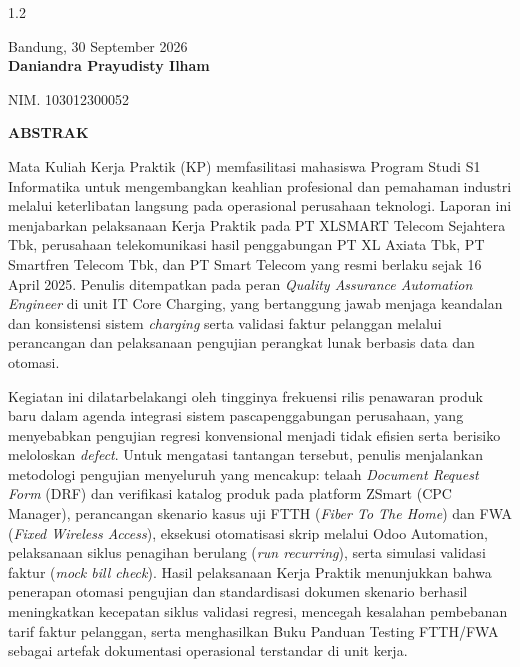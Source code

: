 \documentclass[12pt,a4paper]{article}
\begin{document}
\begin{spacing}{1.2}
\vspace{0.25cm}
\noindent
\begin{flushright}
    Bandung, 30 September 2026\\[0.9cm]
    \textbf{Daniandra Prayudisty Ilham}\par
    NIM. 103012300052
\end{flushright}
\end{spacing}

\clearpage
\begin{center}
    {\bfseries\large ABSTRAK\par}
\end{center}
\vspace{0.6cm}

Mata Kuliah Kerja Praktik (KP) memfasilitasi mahasiswa Program Studi S1 Informatika untuk mengembangkan keahlian profesional dan pemahaman industri melalui keterlibatan langsung pada operasional perusahaan teknologi. Laporan ini menjabarkan pelaksanaan Kerja Praktik pada PT XLSMART Telecom Sejahtera Tbk, perusahaan telekomunikasi hasil penggabungan PT XL Axiata Tbk, PT Smartfren Telecom Tbk, dan PT Smart Telecom yang resmi berlaku sejak 16 April 2025. Penulis ditempatkan pada peran \textit{Quality Assurance Automation Engineer} di unit IT Core Charging, yang bertanggung jawab menjaga keandalan dan konsistensi sistem \textit{charging} serta validasi faktur pelanggan melalui perancangan dan pelaksanaan pengujian perangkat lunak berbasis data dan otomasi.

Kegiatan ini dilatarbelakangi oleh tingginya frekuensi rilis penawaran produk baru dalam agenda integrasi sistem pascapenggabungan perusahaan, yang menyebabkan pengujian regresi konvensional menjadi tidak efisien serta berisiko meloloskan \textit{defect}. Untuk mengatasi tantangan tersebut, penulis menjalankan metodologi pengujian menyeluruh yang mencakup: telaah \textit{Document Request Form} (DRF) dan verifikasi katalog produk pada platform ZSmart (CPC Manager), perancangan skenario kasus uji FTTH (\textit{Fiber To The Home}) dan FWA (\textit{Fixed Wireless Access}), eksekusi otomatisasi skrip melalui Odoo Automation, pelaksanaan siklus penagihan berulang (\textit{run recurring}), serta simulasi validasi faktur (\textit{mock bill check}). Hasil pelaksanaan Kerja Praktik menunjukkan bahwa penerapan otomasi pengujian dan standardisasi dokumen skenario berhasil meningkatkan kecepatan siklus validasi regresi, mencegah kesalahan pembebanan tarif faktur pelanggan, serta menghasilkan Buku Panduan Testing FTTH/FWA sebagai artefak dokumentasi operasional terstandar di unit kerja.
\end{document}
